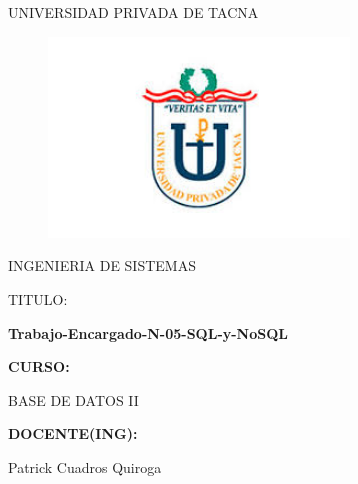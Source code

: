 \documentclass[%
 reprint,
 amsmath,amssymb,
 aps,
]{revtex4-1}
\begin{document}
\begin{titlepage}
\begin{center}
\large{UNIVERSIDAD PRIVADA DE TACNA}\\
\vspace*{-0.025in}
\begin{figure}[htb]
\begin{center}
\includegraphics[width=8cm]{./Imagenes/upt}
\end{center}
\end{figure}
\vspace*{0.15in}
INGENIERIA DE SISTEMAS  \\

\vspace*{0.5in}
\begin{large}
TITULO:\\
\end{large}

\vspace*{0.1in}
\begin{Large}
\textbf{Trabajo-Encargado-N-05-SQL-y-NoSQL} \\
\end{Large}

\vspace*{0.3in}
\begin{Large}
\textbf{CURSO:} \\
\end{Large}

\vspace*{0.1in}
\begin{large}
BASE DE DATOS II\\
\end{large}

\vspace*{0.3in}
\begin{Large}
\textbf{DOCENTE(ING):} \\
\end{Large}

\vspace*{0.1in}
\begin{large}
 Patrick Cuadros Quiroga\\
\end{large}


\end{center}
\end{titlepage}
\end{document}
